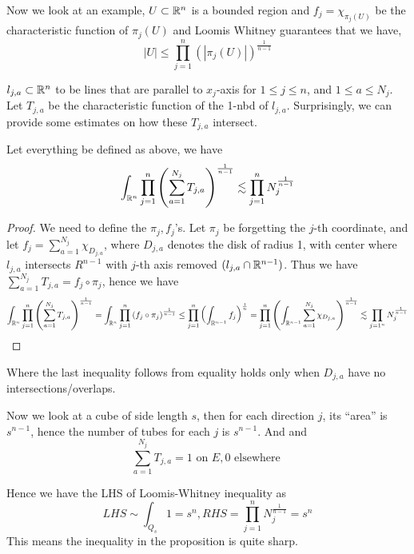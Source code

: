 Now we look at an example, $U\subset\mathbb{R}^n$ is a bounded region and $f_j=\chi_{\pi_j(U)}$ be the characteristic function of $\pi_j(U)$ and Loomis Whitney guarantees that we have,
\begin{equation*}
    |U|\leq\prod_{j=1}^n(|\pi_j(U)|)^{\frac{1}{n-1}}
\end{equation*}

$l_{j,a}\subset\mathbb{R}^n$ to be lines that are parallel to $x_j$-axis for $1\leq j\leq n$, and $1\leq a\leq N_j$. Let $T_{j,a}$ be the characteristic function of the 1-nbd of $l_{j,a}$. Surprisingly, we can provide some estimates on how these $T_{j,a}$ intersect.

\begin{proposition}
    Let everything be defined as above, we have
    \begin{equation*}
        \int_{\mathbb{R}^n}\prod_{j=1}^n\left(\sum_{a=1}^{N_j}T_{j,a}\right)^{\frac{1}{n-1}}\lesssim \prod_{j=1}^nN_j^{\frac{1}{n-1}}
    \end{equation*}
\end{proposition}
\begin{proof}
    We need to define the $\pi_j, f_j$'s. Let $\pi_j$ be forgetting the $j$-th coordinate, and let $f_j=\sum_{a=1}^{N_j}\chi_{D_{j,a}}$, where $D_{j,a}$ denotes the disk of radius 1, with center where $l_{j,a}$ intersects $R^{n-1}$ with $j$-th axis removed $(l_{j,a}\cap\mathbb{R}^{n-1})$. Thus we have $\sum_{a=1}^{N_j}T_{j,a}=f_j\circ\pi_j$, hence we have
    \begin{equation*}
        \int_{\mathbb{R}^n}\prod_{j=1}^n\left(\sum_{a=1}^{N_j}T_{j,a}\right)^{\frac{1}{n-1}}=\int_{\mathbb{R}^n}\prod_{j=1}^n\left(f_j\circ\pi_j\right)^{\frac{1}{n-1}}\leq \prod_{j=1}^n\left(\int_{\mathbb{R}^{n-1}}f_j\right)^{\frac{1}{n}}=\prod_{j=1}^n\left(\int_{\mathbb{R}^{n-1}}\sum_{a=1}^{N_j}\chi_{D_{j,a}}\right)^{\frac{1}{n-1}}\lesssim \prod_{j=1^n}N_j^{\frac{1}{n-1}}
    \end{equation*}
\end{proof}
Where the last inequality follows from equality holds only when $D_{j,a}$ have no intersections/overlaps. 

\begin{example}
    Now we look at a cube of side length $s$, then for each direction $j$, its ``area'' is $s^{n-1}$, hence the number of tubes for each $j$ is $s^{n-1}$. And and 
    \begin{equation*}
        \sum_{a=1}^{N_j}T_{j,a}=1 \text{ on } E, 0 \text{ elsewhere }
    \end{equation*}
\end{example}
Hence we have the LHS of Loomis-Whitney inequality as
\begin{equation*}
    LHS\sim\int_{Q_s}1=s^n, RHS=\prod_{j=1}^nN_j^{\frac{1}{n-1}}=s^n
\end{equation*}
This means the inequality in the proposition is quite sharp.

